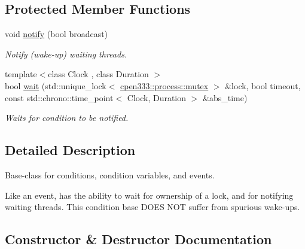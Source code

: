 \subsection*{Protected Member Functions}
\begin{DoxyCompactItemize}
\item 
void \hyperlink{classcpen333_1_1process_1_1condition__base_af6f7110f5be9935ac2fbea2b303a2903}{notify} (bool broadcast)
\begin{DoxyCompactList}\small\item\em Notify (wake-\/up) waiting threads. \end{DoxyCompactList}\item 
{\footnotesize template$<$class Clock , class Duration $>$ }\\bool \hyperlink{classcpen333_1_1process_1_1condition__base_a3132db3bcedcddf3a8e5ac24df8d9efa}{wait} (std\+::unique\+\_\+lock$<$ \hyperlink{classcpen333_1_1process_1_1mutex}{cpen333\+::process\+::mutex} $>$ \&lock, bool timeout, const std\+::chrono\+::time\+\_\+point$<$ Clock, Duration $>$ \&abs\+\_\+time)
\begin{DoxyCompactList}\small\item\em Waits for condition to be notified. \end{DoxyCompactList}\end{DoxyCompactItemize}


\subsection{Detailed Description}
Base-\/class for conditions, condition variables, and events. 

Like an event, has the ability to wait for ownership of a lock, and for notifying waiting threads. This condition base D\+O\+ES N\+OT suffer from spurious wake-\/ups. 

\subsection{Constructor \& Destructor Documentation}
\mbox{\label{classcpen333_1_1process_1_1condition__base_a23384ba303cc2111cc4272830ae9f72b}} 
